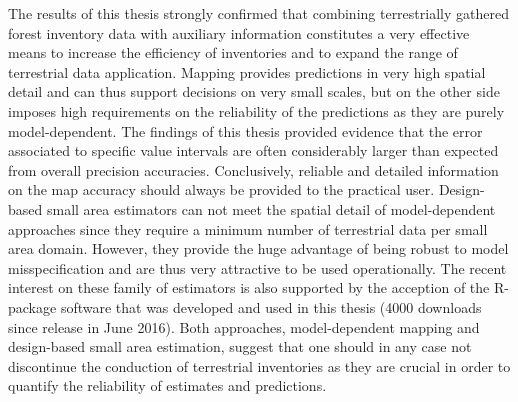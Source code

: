 The results of this thesis strongly confirmed that combining terrestrially gathered forest inventory data with auxiliary information constitutes a very effective means to increase the efficiency of inventories and to expand the range of terrestrial data application. Mapping provides predictions in very high spatial detail and can thus support decisions on very small scales, but on the other side imposes high requirements on the reliability of the predictions as they are purely model-dependent. The findings of this thesis provided evidence that the error associated to specific value intervals are often considerably larger than expected from overall precision accuracies. Conclusively, reliable and detailed information on the map accuracy should always be provided to the practical user. Design-based small area estimators can not meet the spatial detail of model-dependent approaches since they require a minimum number of terrestrial data per small area domain. However, they provide the huge advantage of being robust to model misspecification and are thus very attractive to be used operationally. The recent interest on these family of estimators is also supported by the acception of the R-package software that was developed and used in this thesis (4000 downloads since release in June 2016). Both approaches, model-dependent mapping and design-based small area estimation, suggest that one should in any case not discontinue the conduction of terrestrial inventories as they are crucial in order to quantify the reliability of estimates and predictions.\par

